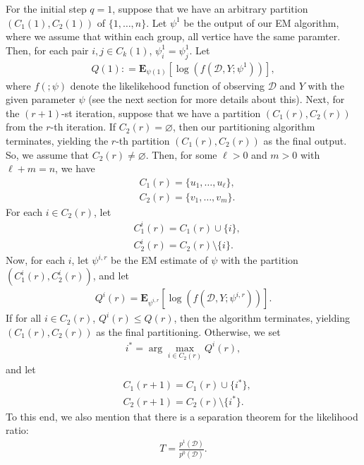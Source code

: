 \documentclass[12pt]{article}%
\begin{document}
For the initial step $q=1$, suppose that we have 
an arbitrary partition $(C_1(1), C_2(1))$ of $\{1,\ldots, n\}$. 
Let $\psi^1$ be the output of our EM algorithm, where we assume that within each group,
all vertice have the same paramter.  Then, for each pair $i, j \in C_k(1)$, $\psi_i^1 = \psi_j^1$.  
Let
\begin{eqnarray}
Q(1) : = \mathbf E_{\psi(1)}\left[\log(f(\mathcal D, Y;\psi^1))\right],
\end{eqnarray}
where $f(;\psi)$ denote the likelikehood function of observing $\mathcal D$ and $Y$ with the given parameter $\psi$ (see the next section for more details about this). 
Next, for the $(r+1)$-st iteration, suppose that we have a partition $(C_1(r), C_2(r))$ from the $r$-th iteration. 
If $C_2(r) = \varnothing$, then our partitioning algorithm terminates, yielding the $r$-th partition 
$(C_1(r), C_2(r))$ as the final output.  So, we assume that $C_2(r)\neq \varnothing$.  Then, for some $\ell > 0$ and $m > 0$ with $\ell + m = n$, we have 
\begin{eqnarray}
&C_1(r) = \{u_1,\ldots, u_\ell\},\\
&C_2(r) = \{v_1,\ldots, v_m\}.
\end{eqnarray} 
For each $i \in C_2(r)$, let 
\begin{eqnarray}
&C_1^{i}(r) = C_1(r) \cup \{i\}, \\
&C_2^{i}(r) = C_2(r) \setminus \{i\}.
\end{eqnarray}
Now, for each $i$, let $\psi^{i,r}$ be the EM estimate of $\psi$ with the partition $(C_1^{i}(r), C_2^{i}(r))$, and let 
\begin{eqnarray}
Q^{i}(r) = \mathbf E_{\psi^{i,r}}\left[\log(f(\mathcal D,Y;\psi^{i,r}))\right].
\end{eqnarray}
If for all $i \in C_2(r)$, $Q^{i}(r) \le Q(r)$, then the algorithm terminates, yielding 
$(C_1(r), C_2(r))$ as the final partitioning.  Otherwise, we set 
\begin{eqnarray}
i^* = \arg\max_{i \in C_2(r)} Q^{i}(r),
\end{eqnarray}
and let 
\begin{eqnarray}
&C_1(r+1) = C_1(r) \cup \{i^*\},\\
&C_2(r+1) = C_2(r) \setminus \{i^*\}.
\end{eqnarray}
To this end, we also mention that there is a separation theorem for 
the likelihood ratio:
\begin{eqnarray}
T = \frac{p^1(\mathcal D)}{p^0(\mathcal D)}.
\end{eqnarray} 
\end{document}
